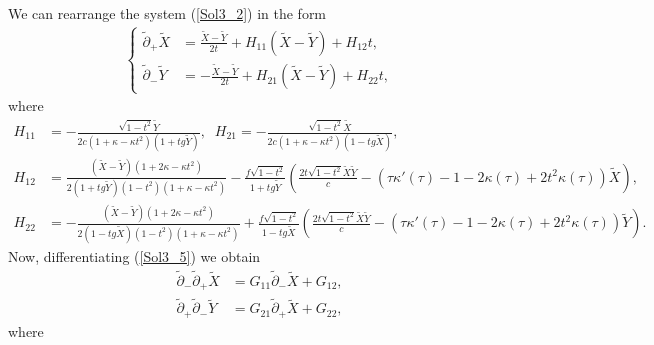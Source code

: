 \documentclass[3p,11pt]{elsarticle}
\numberwithin{equation}{section}
\begin{document}
We can rearrange the system (\ref{Sol3_2}) in the form
\begin{equation}\label{Sol3_5}
    \begin{split}
        \begin{cases}
          \tilde\partial_+\widetilde X &= \frac{\widetilde X-\widetilde Y}{2t}+H_{11}(\widetilde X-\widetilde Y)+H_{12}t,\\
          \tilde\partial_-\widetilde Y &= -\frac{\widetilde X-\widetilde Y}{2t}+H_{21}(\widetilde X-\widetilde Y)+H_{22}t,
        \end{cases}
    \end{split}
\end{equation}
where
\begin{equation}\label{Sol3_6}
    \begin{split}
        H_{11}&= -\frac{\sqrt{1-t^2}\widetilde Y}{2c(1+\kappa-\kappa t^2)(1+tg\widetilde Y)},\;\; H_{21}= -\frac{\sqrt{1-t^2}\widetilde X}{2c(1+\kappa-\kappa t^2)(1-tg\widetilde X)},\\
        H_{12} &=\frac{(\widetilde X-\widetilde Y)(1+2\kappa-\kappa t^2)}{2(1+tg\widetilde Y)(1-t^2)(1+\kappa-\kappa t^2)}-\frac{f\sqrt{1-t^2}}{1+tg\widetilde Y}\left(\frac{2t\sqrt{1-t^2}\widetilde X\widetilde Y}{c}-\left(\tau\kappa'(\tau)-1-2\kappa(\tau)+2t^2\kappa(\tau)\right)\widetilde X \right),\\
        H_{22} &=-\frac{(\widetilde X-\widetilde Y)(1+2\kappa-\kappa t^2)}{2(1-tg\widetilde X)(1-t^2)(1+\kappa-\kappa t^2)}+\frac{f\sqrt{1-t^2}}{1-tg\widetilde X}\left(\frac{2t\sqrt{1-t^2}\widetilde X\widetilde Y}{c}-\left(\tau\kappa'(\tau)-1-2\kappa(\tau)+2t^2\kappa(\tau)\right)\widetilde Y \right).
    \end{split}
\end{equation}
Now, differentiating (\ref{Sol3_5}) we obtain
\begin{equation}\label{Sol3_7}
    \begin{split}
        \tilde\partial_-\tilde\partial_+\widetilde X &=G_{11}\tilde\partial_-\widetilde X+G_{12},\\
        \tilde\partial_+\tilde\partial_-\widetilde Y &=G_{21}\tilde\partial_+\widetilde X+G_{22},
    \end{split}
\end{equation}
where
\end{document}
